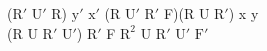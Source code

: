 ($\text{R}'$ $\text{U}'$ R) $\text{y}'$ $\text{x}'$ (R $\text{U}'$ $\text{R}'$ F)(R U $\text{R}'$) x y\\
(R U $\text{R}'$ $\text{U}'$) $\text{R}'$ F $\text{R}^2$ U $\text{R}'$ $\text{U}'$ $\text{F}'$\\
